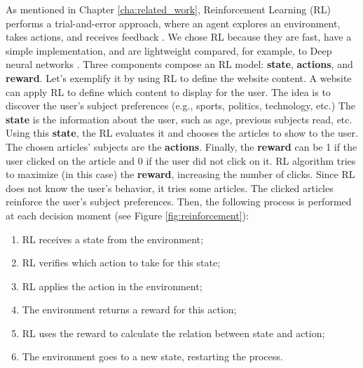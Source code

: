 As mentioned in Chapter \ref{cha:related_work}, Reinforcement Learning (RL) performs a trial-and-error approach, where an agent explores an environment, takes actions, and receives feedback \cite{kaelbling1996reinforcement}. We chose RL because they are fast, have a simple implementation, and are lightweight compared, for example, to Deep neural networks \cite{yang2017method}. Three components compose an RL model: \textbf{state}, \textbf{actions}, and \textbf{reward}. Let's exemplify it by using RL to define the website content. A website can apply RL to define which content to display for the user. The idea is to discover the user's subject preferences (e.g., sports, politics, technology, etc.) The \textbf{state} is the information about the user, such as age, previous subjects read, etc. Using this \textbf{state}, the RL evaluates it and chooses the articles to show to the user. The chosen articles' subjects are the \textbf{actions}. Finally, the \textbf{reward} can be 1 if the user clicked on the article and 0 if the user did not click on it. RL algorithm tries to maximize (in this case) the \textbf{reward}, increasing the number of clicks. Since RL does not know the user's behavior, it tries some articles. The clicked articles reinforce the user's subject preferences. Then, the following process is performed at each decision moment (see Figure \ref{fig:reinforcement}):
\begin{enumerate}
    \item RL receives a state from the environment;
    \item RL verifies which action to take for this state;
    \item RL applies the action in the environment;
    \item The environment returns a reward for this action;
    \item RL uses the reward to calculate the relation between state and action;
    \item The environment goes to a new state, restarting the process.
\end{enumerate}


